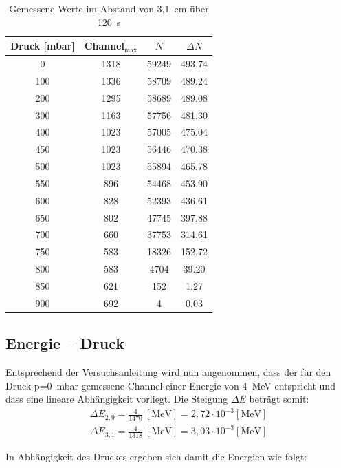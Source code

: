 \begin{table}[H]
\renewcommand{\arraystretch}{.95}
\begin{tabular}{|c|c|c|c|} 
Druck [mbar]	&Channel$_\text{max}$	&$N$	&$\Delta N$\\ \hline
0	&1318	&59249	&493.74 \\ \hline
100	&1336	&58709	&489.24\\ \hline
200	&1295	&58689	&489.08\\ \hline
300	&1163	&57756	&481.30\\ \hline
400	&1023	&57005	&475.04\\ \hline
450	&1023	&56446	&470.38\\ \hline
500	&1023	&55894	&465.78\\ \hline
550	&896	&54468	&453.90\\ \hline
600	&828	&52393	&436.61\\ \hline
650	&802	&47745	&397.88\\ \hline
700	&660	&37753	&314.61\\ \hline
750	&583	&18326	&152.72\\ \hline
800	&583	&4704	&39.20\\ \hline
850	&621	&152	&1.27\\ \hline
900	&692	&4		&0.03\\ \hline
\end{tabular} 
\renewcommand{\arraystretch}{1}
\caption{Gemessene Werte im Abstand von 3,1~cm über 120~s}
\end{table}

\subsection{Energie -- Druck}
Entsprechend der Versuchsanleitung wird nun angenommen, dass der für den Druck p=0~mbar gemessene Channel einer Energie von 4~MeV entspricht und dass eine lineare Abhängigkeit vorliegt. Die Steigung $\Delta E$ beträgt somit:
\begin{align*}
\Delta E_{2,9}=\frac{4}{1470}~[\text{MeV}] = 2,72\cdot10^{-3}[\text{MeV}]\\
\Delta E_{3,1}=\frac{4}{1318}~[\text{MeV}] = 3,03\cdot10^{-3}[\text{MeV}]
\end{align*}

In Abhängigkeit des Druckes ergeben sich damit die Energien wie folgt:\\


